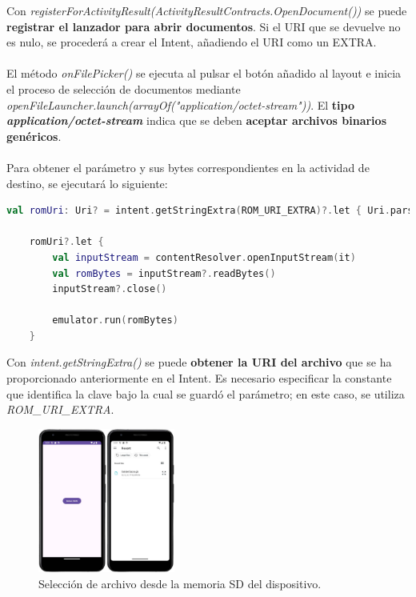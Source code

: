 Con \textit{registerForActivityResult(ActivityResultContracts.OpenDocument())} se puede \textbf{registrar el lanzador para abrir documentos}. Si el URI que se devuelve no es nulo, se procederá a crear el Intent, añadiendo el URI como un EXTRA.
\\\\
El método \textit{onFilePicker()} se ejecuta al pulsar el botón añadido al layout e inicia el proceso de selección de documentos mediante \textit{openFileLauncher.launch(arrayOf("application/octet-stream"))}. El \textbf{tipo \textit{application/octet-stream}} indica que se deben \textbf{aceptar archivos binarios genéricos}.
\\\\
Para obtener el parámetro y sus bytes correspondientes en la actividad de destino, se ejecutará lo siguiente:

\begin{lstlisting}[language=Kotlin, caption={Obtener EXTRA de un Intent en Android}, label={code:kotlinextra}]
    val romUri: Uri? = intent.getStringExtra(ROM_URI_EXTRA)?.let { Uri.parse(it) }

    romUri?.let {
        val inputStream = contentResolver.openInputStream(it)
        val romBytes = inputStream?.readBytes()
        inputStream?.close()

        emulator.run(romBytes)
    }
\end{lstlisting}

Con \textit{intent.getStringExtra()} se puede \textbf{obtener la URI del archivo} que se ha proporcionado anteriormente en el Intent. Es necesario especificar la constante que identifica la clave bajo la cual se guardó el parámetro; en este caso, se utiliza \textit{ROM\_URI\_EXTRA}.

\begin{figure}[H]
\centering
\includegraphics[width=0.4\textwidth]{include/images/openfile.jpg}
\caption{Selección de archivo desde la memoria SD del dispositivo.}
\label{figure:sdopen}
\end{figure}


